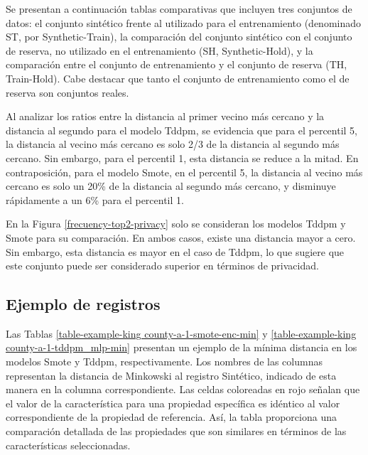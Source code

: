 Se presentan a continuación tablas comparativas que incluyen tres conjuntos de datos: el conjunto sintético frente al utilizado para el entrenamiento (denominado ST, por Synthetic-Train), la comparación del conjunto sintético con el conjunto de reserva, no utilizado en el entrenamiento (SH, Synthetic-Hold), y la comparación entre el conjunto de entrenamiento y el conjunto de reserva (TH, Train-Hold). Cabe destacar que tanto el conjunto de entrenamiento como el de reserva son conjuntos reales.






\newpage
Al analizar los ratios entre la distancia al primer vecino más cercano y la distancia al segundo para el modelo Tddpm, se evidencia que para el percentil 5, la distancia al vecino más cercano es solo 2/3 de la distancia al segundo más cercano. Sin embargo, para el percentil 1, esta distancia se reduce a la mitad. En contraposición, para el modelo Smote, en el percentil 5, la distancia al vecino más cercano es solo un 20\% de la distancia al segundo más cercano, y disminuye rápidamente a un 6\% para el percentil 1.







\newpage
En la Figura \ref{frecuency-top2-privacy} solo se consideran los modelos Tddpm y Smote para su comparación. En ambos casos, existe una distancia mayor a cero. Sin embargo, esta distancia es mayor en el caso de Tddpm, lo que sugiere que este conjunto puede ser considerado superior en términos de privacidad.



\newpage
\subsection{Ejemplo de registros}
\label{ejemplos-kingcounty}
Las Tablas \ref{table-example-king county-a-1-smote-enc-min} y \ref{table-example-king county-a-1-tddpm_mlp-min} presentan un ejemplo de la mínima distancia en los modelos Smote y Tddpm, respectivamente. Los nombres de las columnas representan la distancia de Minkowski al registro Sintético, indicado de esta manera en la columna correspondiente. Las celdas coloreadas en rojo señalan que el valor de la característica para una propiedad específica es idéntico al valor correspondiente de la propiedad de referencia. Así, la tabla proporciona una comparación detallada de las propiedades que son similares en términos de las características seleccionadas.

